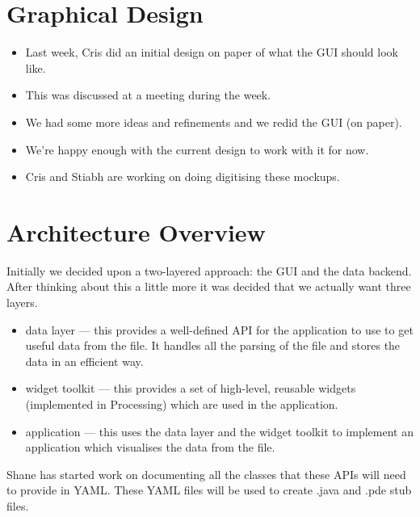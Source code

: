 \documentclass[titlepage,a4paper]{article}
\begin{document}
\section{Graphical Design}
\begin{itemize}
\item Last week, Cris did an initial design on paper of what the GUI should look
like.
\item This was discussed at a meeting during the week.
\item We had some more ideas and refinements and we redid the GUI (on paper).
\item We're happy enough with the current design to work with it for now.
\item Cris and Stiabh are working on doing digitising these mockups.
\end{itemize}

\section{Architecture Overview}
Initially we decided upon a two-layered approach: the GUI and the data
backend. After thinking about this a little more it was decided that we actually
want three layers.
\begin{itemize}
\item data layer --- this provides a well-defined API for the application to
use to get useful data from the  file. It handles all the parsing of
the  file and stores the data in an efficient way.
\item widget toolkit --- this provides a set of high-level, reusable widgets
(implemented in Processing) which are used in the application.
\item application --- this uses the data layer and the widget toolkit to
implement an application which visualises the data from the  file.
\end{itemize}
\par Shane has started work on documenting all the classes that these APIs will
need to provide in YAML. These YAML files will be used to create .java and .pde
stub files.
\end{document}
